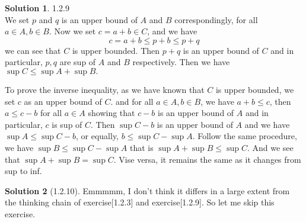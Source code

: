 \documentclass{article}
\theoremstyle{definition}
\newtheorem{sol}{Solution}[exe]
\begin{document}
\begin{sol} 1.2.9\\
    We set $p$ and $q$ is an upper bound of $A$ and $B$ correspondingly, for all $a\in A,b\in B$. Now we set $c=a+b\in C$, and we have 
    $$c=a+b\leq p+b\leq p+q$$
    we can see that $C$ is upper bounded. Then $p+q$ is an upper bound of $C$ and in particular, $p,q$ are sup of $A$ and $B$ respectively. Then we have $\sup C\leq\sup A+\sup B.$

    To prove the inverse inequality, as we have known that $C$ is upper bounded, we set $c$ as an upper bound of $C$. and for all $a\in A,b\in B$, we have $a+b\leq c$, then $a\leq c-b$ for
    all $a\in A$ showing that $c-b$ is an upper bound of $A$ and in particular, $c$ is sup of $C$. Then $\sup C-b$ is an upper bound of $A$ and we have $\sup A\leq \sup C-b$, or equally, 
    $b\leq \sup C-\sup A$. Follow the same procedure, we have $\sup B\leq \sup C-\sup A$ that is $\sup A+\sup B\leq \sup C$. And we see that $\sup A+\sup B=\sup C$. Vise versa, it remains the same 
    as it changes from sup to inf.
\end{sol}


\begin{sol}[1.2.10]
    Emmmmm, I don't think it differs in a large extent from the thinking chain of exercise[1.2.3] and exercise[1.2.9]. So let me skip this exercise.
\end{sol}
\end{document}
